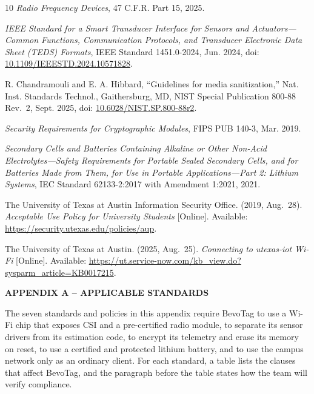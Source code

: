 \documentclass[12pt,letterpaper]{article}
\begin{document}
\begin{thebibliography}{10}
\emph{Radio Frequency Devices}, 47 C.F.R. Part 15, 2025.


\emph{IEEE Standard for a Smart Transducer Interface for Sensors and Actuators---Common Functions,
Communication Protocols, and Transducer Electronic Data Sheet (TEDS) Formats}, IEEE Standard
1451.0-2024, Jun. 2024, doi: \url{10.1109/IEEESTD.2024.10571828}.


R. Chandramouli and E. A. Hibbard, ``Guidelines for media sanitization,'' Nat. Inst. Standards
Technol., Gaithersburg, MD, NIST Special Publication 800-88 Rev.~2, Sept. 2025,
doi: \url{10.6028/NIST.SP.800-88r2}.


\emph{Security Requirements for Cryptographic Modules}, FIPS PUB 140-3, Mar. 2019.


\emph{Secondary Cells and Batteries Containing Alkaline or Other Non-Acid Electrolytes---Safety
Requirements for Portable Sealed Secondary Cells, and for Batteries Made from Them, for Use in
Portable Applications---Part 2: Lithium Systems}, IEC Standard 62133-2:2017 with Amendment 1:2021, 2021.


The University of Texas at Austin Information Security Office. (2019, Aug.~28). \emph{Acceptable
Use Policy for University Students} [Online]. Available:\newline
\url{https://security.utexas.edu/policies/aup}.

The University of Texas at Austin. (2025, Aug.~25). \emph{Connecting to utexas-iot Wi-Fi}
[Online]. Available: \url{https://ut.service-now.com/kb_view.do?sysparm_article=KB0017215}.

\end{thebibliography}

\clearpage
\vspace*{0.20\textheight}
\begin{center}
\textbf{APPENDIX A -- APPLICABLE STANDARDS}
\end{center}
\clearpage

The seven standards and policies in this appendix require BevoTag to use a Wi-Fi chip that exposes
CSI and a pre-certified radio module, to separate its sensor drivers from its estimation code, to
encrypt its telemetry and erase its memory on reset, to use a certified and protected lithium
battery, and to use the campus network only as an ordinary client. For each standard, a table lists
the clauses that affect BevoTag, and the paragraph before the table states how the team will verify
compliance.
\end{document}
